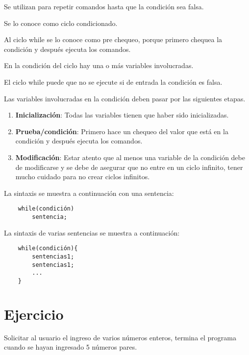 Se utilizan para repetir comandos hasta que la condición sea falsa.

\vspace{1em}
Se lo conoce como ciclo condicionado.

\vspace{1em}
{Al ciclo while se lo conoce como pre chequeo, porque primero chequea la condición y después ejecuta los comandos.}

\vspace{1em}
En la condición del ciclo hay una o más variables involucradas.

\vspace{1em}
{El ciclo while puede que no se ejecute si de entrada la condición es falsa.}

\vspace{1em}
Las variables involucradas en la condición deben pasar por las siguientes etapas.

\begin{enumerate}
	\item \textbf{Inicialización}: Todas las variables tienen que haber sido inicializadas.
	\item \textbf{Prueba/condición}: Primero hace un chequeo del valor que está en la condición y después ejecuta los comandos.
	\item \textbf{Modificación}: Estar atento que al menos una variable de la condición debe de modificarse y se debe de asegurar que no entre en un ciclo infinito, tener mucho cuidado para no crear ciclos infinitos.
\end{enumerate}

\vspace{1em}
La sintaxis se muestra a continuación con una sentencia:

\begin{verbatim}
	while(condición)
		sentencia;
\end{verbatim}

\space{1em}
La sintaxis de varias sentencias se muestra a continuación:

\begin{verbatim}
	while(condición){
		sentencias1;
		sentencias1;
		...
	}
\end{verbatim}

\section [Ejercicio]{Ejercicio}
Solicitar al usuario el ingreso de varios números enteros, termina el programa cuando se hayan ingresado 5 números pares.


